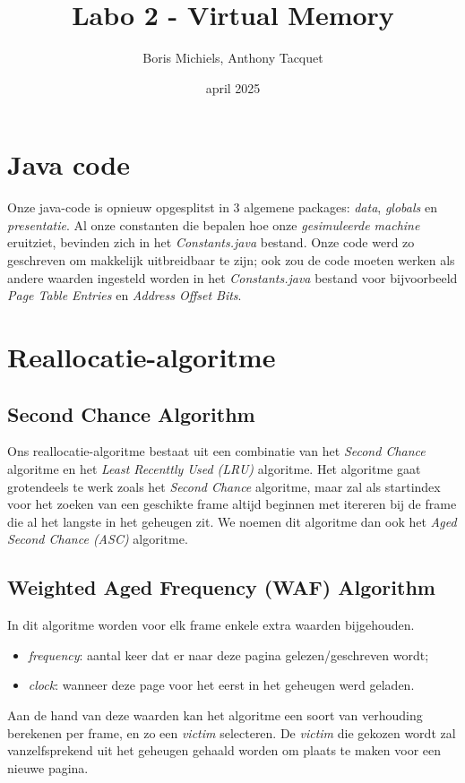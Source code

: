 \documentclass[a4paper,12pt]{article}
\title{Labo 2 - Virtual Memory}
\author{Boris Michiels, Anthony Tacquet}
\date{april 2025}
\begin{document}
\maketitle
\newpage

\section{Java code}
Onze java-code is opnieuw opgesplitst in 3 algemene packages: \textit{data}, \textit{globals} en \textit{presentatie}. Al onze constanten die bepalen hoe onze \textit{gesimuleerde machine} eruitziet, bevinden zich in het \textit{Constants.java} bestand. Onze code werd zo geschreven om makkelijk uitbreidbaar te zijn; ook zou de code moeten werken als andere waarden ingesteld worden in het \textit{Constants.java} bestand voor bijvoorbeeld \textit{Page Table Entries} en \textit{Address Offset Bits}.


\section{Reallocatie-algoritme}
\subsection{Second Chance Algorithm}

Ons reallocatie-algoritme bestaat uit een combinatie van het \textit{Second Chance} algoritme en het \textit{Least Recenttly Used (LRU)} algoritme. Het algoritme gaat grotendeels te werk zoals het \textit{Second Chance} algoritme, maar zal als startindex voor het zoeken van een geschikte frame altijd beginnen met itereren bij de frame die al het langste in het geheugen zit. We noemen dit algoritme dan ook het \textit{Aged Second Chance (ASC)} algoritme.

\subsection{Weighted Aged Frequency (WAF) Algorithm}
In dit algoritme worden voor elk frame enkele extra waarden bijgehouden.
\begin{itemize}
    \item \textit{frequency}: aantal keer dat er naar deze pagina gelezen/geschreven wordt;
    \item \textit{clock}: wanneer deze page voor het eerst in het geheugen werd geladen.
\end{itemize}

Aan de hand van deze waarden kan het algoritme een soort van verhouding berekenen per frame, en zo een \textit{victim} selecteren. De \textit{victim} die gekozen wordt zal vanzelfsprekend uit het geheugen gehaald worden om plaats te maken voor een nieuwe pagina.
\end{document}
